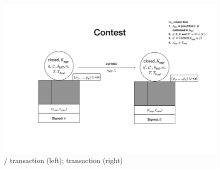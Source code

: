 \begin{figure}[t!]

  \centering


  \includegraphics[width=\textwidth/2]{figures/SM_closed_closed.pdf}

  \caption{\mtxClose{}/\mtxContest{} transaction (left);
    \mtxContest{} transaction (right)}
  \label{fig:SM_closed_closed}

\end{figure}



